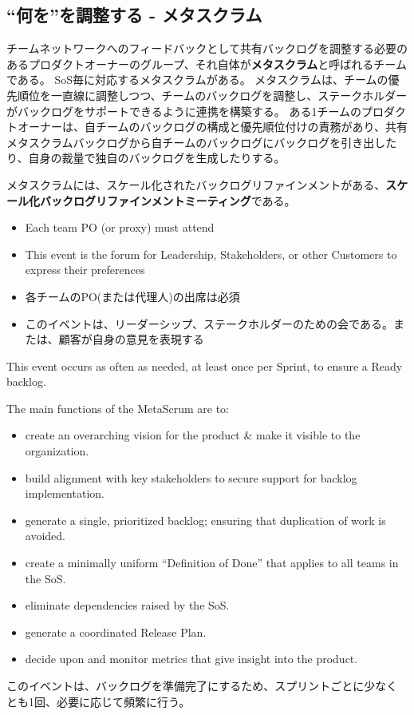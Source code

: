 \documentclass[12pt,a4paper,parskip=full]{scrartcl}
\begin{document}
\subsection{``何を''を調整する - メタスクラム}
チームネットワークへのフィードバックとして共有バックログを調整する必要のあるプロダクトオーナーのグループ、それ自体が\textbf{メタスクラム}と呼ばれるチームである。
SoS毎に対応するメタスクラムがある。
メタスクラムは、チームの優先順位を一直線に調整しつつ、チームのバックログを調整し、ステークホルダーがバックログをサポートできるように連携を構築する。
ある1チームのプロダクトオーナーは、自チームのバックログの構成と優先順位付けの責務があり、共有メタスクラムバックログから自チームのバックログにバックログを引き出したり、自身の裁量で独自のバックログを生成したりする。

メタスクラムには、スケール化されたバックログリファインメントがある、\textbf{スケール化バックログリファインメントミーティング}である。
\begin{itemize}
\item Each team PO (or proxy) must attend
\item This event is the forum for Leadership, Stakeholders, or other
Customers to express their preferences
\end{itemize}
\fi
\begin{itemize}
\item 各チームのPO(または代理人)の出席は必須
\item このイベントは、リーダーシップ、ステークホルダーのための会である。または、顧客が自身の意見を表現する
\end{itemize}
This event occurs as often as needed, at least once per Sprint, to ensure a
Ready backlog. 

The main functions of the MetaScrum are to:
\begin{itemize}
\item create an overarching vision for the product \& make it visible to
the organization.
\item build alignment with key stakeholders to secure support for backlog
implementation.
\item generate a single, prioritized backlog; ensuring that duplication of
work is avoided.
\item create a minimally uniform ``Definition of Done'' that applies to all teams in
the SoS.
\item eliminate dependencies raised by the SoS.
\item generate a coordinated Release Plan.
\item decide upon and monitor metrics that give insight into the product.
\end{itemize}
\fi
このイベントは、バックログを準備完了にするため、スプリントごとに少なくとも1回、必要に応じて頻繁に行う。
\end{document}
